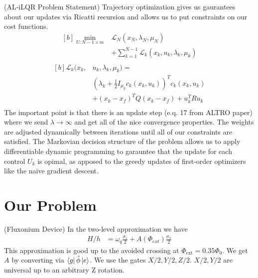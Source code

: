 \documentclass[
  amsfonts,
  amsmath,
  tbtags,
  amssymb,
  aps,
  nobibnotes,
  prl,
  twocolumn,
]{revtex4-2}
\begin{document}
(AL-iLQR Problem Statement) Trajectory optimization gives us gaurantees
about our updates via Ricatti recursion
and allows us to put constraints on our cost functions.
\begin{equation}
\begin{aligned}[b]
  \min_{U:N-1 \times m} &\mathcal{L}_{N}(x_{N}, \lambda_{N}, \mu_{N})\\
  &+ \sum_{k = 1}^{N - 1} \mathcal{L}_{k}(x_{k}, u_{k}, \lambda_{k}, \mu_{k})\\
\end{aligned}
\end{equation}
\begin{equation}
\begin{aligned}[b]
  \mathcal{L}_{k}(x_{k}, &u_{k}, \lambda_{k}, \mu_{k}) =\\
  &(\lambda_{k} + \frac{1}{2}I_{\mu_{k}} c_{k}(x_{k}, u_{k}))^{T} c_{k}(x_{k}, u_{k})\\
  &+ (x_{k} - x_{f})^{T} Q (x_{k} - x_{f}) + u_{k}^{T} R u_{k}\\
\end{aligned}
\end{equation}
The important point is that there is an update step (e.q. 17 from ALTRO paper) where we send $\lambda \rightarrow \infty$
and get all of the nice convergence properties. The weights are adjusted dynamically between iterations until
all of our constraints are satisfied. The Markovian decision structure of the problem allows
us to apply differentiable dynamic programming to garauntee that the update for each control $U_{k}$ is
opimal, as apposed to the greedy updates of first-order optimizers like the naive gradient descent.



\section{Our Problem}
(Fluxonium Device) In the two-level
approximation we have
\begin{align}
  H/h &= \omega_{q} \frac{\sigma_{z}}{2} + A(\Phi_{ext}) \frac{\sigma_{x}}{2}
\end{align}
This approximation is good up to the avoided crossing at $\Phi_{\textrm{ext}} = 0.35 \Phi_{0}$. We get $A$
by converting via $\bra{g} \hat{\phi} \ket{e}$.
We use the gates $X/2, Y/2, Z/2$. $X/2, Y/2$ are universal
up to an arbitrary Z rotation.
\end{document}

